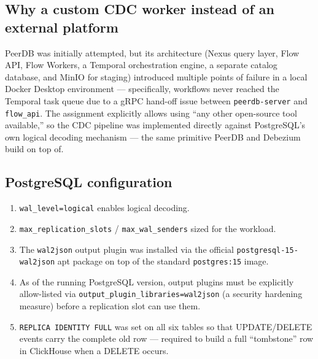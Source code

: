 \documentclass[11pt]{article}
\begin{document}
\subsection*{Why a custom CDC worker instead of an external platform}
PeerDB was initially attempted, but its architecture (Nexus query layer,
Flow API, Flow Workers, a Temporal orchestration engine, a separate
catalog database, and MinIO for staging) introduced multiple points of
failure in a local Docker Desktop environment --- specifically, workflows
never reached the Temporal task queue due to a gRPC hand-off issue between
\texttt{peerdb-server} and \texttt{flow\_api}. The assignment explicitly
allows using ``any other open-source tool available,'' so the CDC pipeline
was implemented directly against PostgreSQL's own logical decoding
mechanism --- the same primitive PeerDB and Debezium build on top of.

\subsection*{PostgreSQL configuration}
\begin{enumerate}
    \item \texttt{wal\_level=logical} enables logical decoding.
    \item \texttt{max\_replication\_slots} / \texttt{max\_wal\_senders} sized for the workload.
    \item The \texttt{wal2json} output plugin was installed via the official
          \texttt{postgresql-15-wal2json} apt package on top of the standard
          \texttt{postgres:15} image.
    \item As of the running PostgreSQL version, output plugins must be
          explicitly allow-listed via \texttt{output\_plugin\_libraries=wal2json}
          (a security hardening measure) before a replication slot can use them.
    \item \texttt{REPLICA IDENTITY FULL} was set on all six tables so that
          UPDATE/DELETE events carry the complete old row --- required to
          build a full ``tombstone'' row in ClickHouse when a DELETE occurs.
\end{enumerate}
\end{document}
